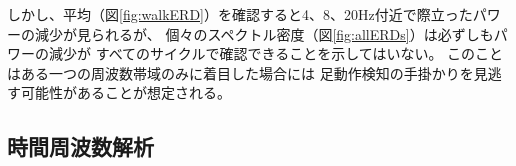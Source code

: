 しかし、平均（図\ref{fig:walkERD}）を確認すると4、8、20Hz付近で際立ったパワーの減少が見られるが、
個々のスペクトル密度（図\ref{fig:allERDs}）は必ずしもパワーの減少が
すべてのサイクルで確認できることを示してはいない。
このことはある一つの周波数帯域のみに着目した場合には
足動作検知の手掛かりを見逃す可能性があることが想定される。

\subsection{時間周波数解析}
